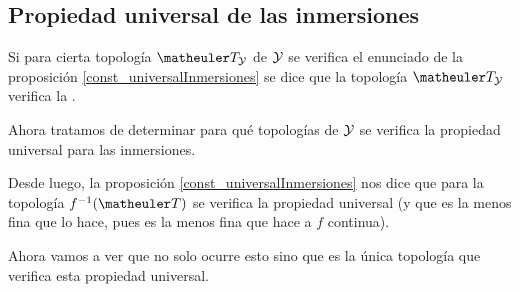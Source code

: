 \subsection{Propiedad universal de las inmersiones}
\begin{defi}
	Si para cierta topología $\T_\Y$ de $\mathcal{Y}$ se verifica el enunciado de la proposición \ref{const_universalInmersiones} se dice que la topología $\T_\Y$ verifica la .
\end{defi}
Ahora tratamos de determinar para qué topologías de $\mathcal{Y}$ se verifica la propiedad universal para las inmersiones.

Desde luego, la proposición \ref{const_universalInmersiones} nos dice que para la topología $f^{-1}(\T)$ se verifica la propiedad universal (y que es la menos fina que lo hace, pues es la menos fina que hace a $f$ continua).

Ahora vamos a ver que no solo ocurre esto sino que es la única topología que verifica esta propiedad universal.

